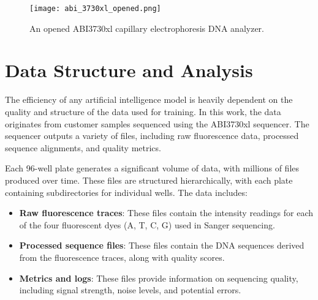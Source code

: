 \begin{figure}[h]
\centering
\texttt{[image: abi\_3730xl\_opened.png]}
\caption{An opened ABI3730xl capillary electrophoresis DNA analyzer.}
\label{fig:abi_3730xl_opened}
\end{figure}

\section{Data Structure and Analysis}
\label{sec:data_analysis }

The efficiency of any artificial intelligence model is heavily dependent on the quality and structure of the data used for training. In this work, the data originates from customer samples sequenced using the ABI3730xl sequencer. The sequencer outputs a variety of files, including raw fluorescence data, processed sequence alignments, and quality metrics.

Each 96-well plate generates a significant volume of data, with millions of files produced over time. These files are structured hierarchically, with each plate containing subdirectories for individual wells. The data includes:
\begin{itemize}
\item \textbf{Raw fluorescence traces}: These files contain the intensity readings for each of the four fluorescent dyes (A, T, C, G) used in Sanger sequencing.
\item \textbf{Processed sequence files}: These files contain the DNA sequences derived from the fluorescence traces, along with quality scores.
\item \textbf{Metrics and logs}: These files provide information on sequencing quality, including signal strength, noise levels, and potential errors.
\end{itemize}



